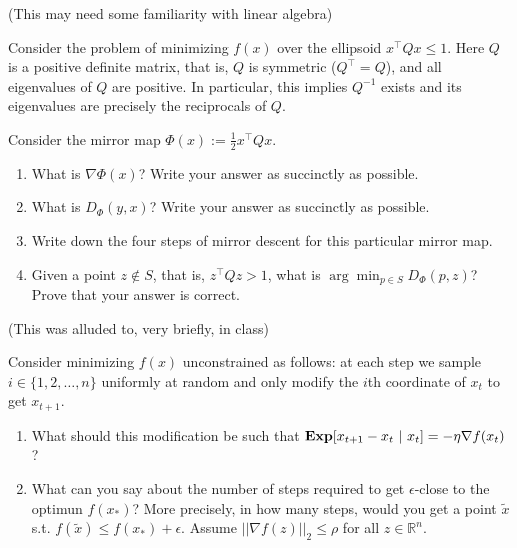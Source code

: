 \documentclass[11pt]{article}
\newcommand{\grad}{\nabla}
\begin{document}
\vspace{1ex}
\begin{exercise}\Coffeecup \Coffeecup (This may need some familiarity with linear algebra) ~
	
	Consider the problem of minimizing $f(x)$ over the ellipsoid $x^\top Q x \leq 1$. Here $Q$ is a positive definite matrix, that is,
	$Q$ is symmetric ($Q^\top = Q$), and all eigenvalues of $Q$ are positive. In particular, this implies $Q^{-1}$ exists and its eigenvalues are precisely the reciprocals of $Q$.
	
	Consider the mirror map $\Phi(x) := \frac{1}{2} x^\top Q x$.
	\begin{enumerate}
		\item What is $\grad \Phi(x)$? Write your answer as succinctly as possible.
		\item What is $D_\Phi(y,x)$? Write your answer as succinctly as possible.
		\item Write down the four steps of mirror descent for this particular mirror map.
		\item Given a point $z\notin S$, that is, $z^\top Q z > 1$, what is $\arg \min_{p\in S} D_\Phi(p,z)$? Prove that your answer is correct.
	\end{enumerate}
\end{exercise}

\vspace{1ex}

\begin{exercise} \Coffeecup \Coffeecup (This was alluded to, very briefly, in class)
	
	Consider minimizing $f(x)$ unconstrained as follows: at each step we sample $i\in \{1,2,\ldots,n\}$ uniformly at random and 
	only modify the $i$th coordinate of $x_t$ to get $x_{t+1}$.
	\begin{enumerate}
		\item What should this modification be such that $\Exp[x_{t+1} - x_{t}~|~x_t] = -\eta \grad f(x_t)$?
		\item What can you say about the number of steps required to get $\epsilon$-close to the optimun $f(x_*)$? More precisely, in how many steps, would you get a point $\tilde{x}$ s.t. $f(\tilde{x}) \leq f(x_*) + \epsilon$. Assume $||\grad f(z)||_2 \leq \rho$ for all $z\in \mathbb{R}^n$.
	\end{enumerate}
\end{exercise}
\end{document}
